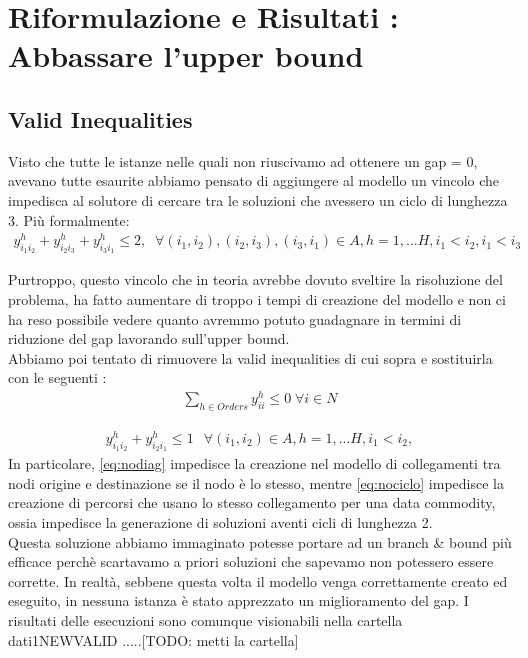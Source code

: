 \documentclass{article}
\begin{document}
\section{Riformulazione e Risultati : Abbassare l'upper bound}

\subsection{Valid Inequalities}
Visto che tutte le istanze nelle quali non riuscivamo ad ottenere un gap = 0, avevano tutte esaurite abbiamo pensato di aggiungere al modello un vincolo che impedisca al solutore di cercare tra le soluzioni che avessero un ciclo di lunghezza 3. Più formalmente:
\begin{align}
    y_{i_{1}i_{2}}^h + y_{i_{2}i_{3}}^h + y_{i_{3}i_{1}}^h \leq 2, \; \;
    \forall (i_1,i_2), (i_2,i_3), (i_3,i_1)   \in A , h=1, ... H,
    i_1 < i_2, i_1 < i_3
\end{align}

Purtroppo, questo vincolo che in teoria avrebbe dovuto sveltire la risoluzione del problema, ha fatto aumentare di troppo i tempi di creazione del modello e non ci ha reso possibile vedere quanto avremmo potuto guadagnare in termini di riduzione del gap lavorando sull'upper bound.
\\
Abbiamo poi tentato di rimuovere la valid inequalities di cui sopra e sostituirla con le seguenti :
\begin{align}
   \sum_{ h \in Orders}y_{ii}^h \leq 0 \; \forall i \in N
   \label{eq:nodiag}
\end{align}

\begin{align}
   y_{i_{1}i_{2}}^h + y_{i_{2}i_{1}}^h \leq 1\, \; \;
    \forall (i_1,i_2)  \in A , h=1, ... H,
    i_1 < i_2,
    \label{eq:nociclo}
\end{align}
In particolare, \cref{eq:nodiag} impedisce la creazione nel modello di collegamenti tra nodi origine e destinazione se il nodo è lo stesso, mentre \cref{eq:nociclo} impedisce la creazione di percorsi che usano lo stesso collegamento per una data commodity, ossia impedisce la generazione di soluzioni aventi cicli di lunghezza 2.
\\
Questa soluzione abbiamo immaginato potesse portare ad un branch \& bound più efficace perchè scartavamo a priori soluzioni che sapevamo non potessero essere corrette. In realtà, sebbene questa volta il modello venga correttamente creato ed eseguito, in nessuna istanza è stato apprezzato un miglioramento del gap.
I risultati delle esecuzioni sono comunque visionabili nella cartella dati1NEWVALID .....[TODO: metti la cartella]
\end{document}
